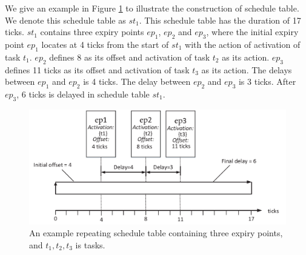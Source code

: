 \documentclass[10pt,conference]{IEEEtran}
\begin{document}
We give an example in Figure \ref{figure_st1} to illustrate the construction of schedule table. We denote this schedule table as $st_1$. This schedule table has the duration of 17 ticks. $st_1$ contains three expiry points $ep_1$, $ep_2$ and $ep_3$, where the initial expiry point $ep_1$ locates at 4 ticks from the start of $st_1$ with the action of activation of task $t_1$. $ep_2$ defines 8 as its offset and activation of task $t_2$ as its action. $ep_3$ defines 11 ticks as its offset and activation of task $t_3$ as its action. The delays between $ep_1$ and $ep_2$ is 4 ticks. The delay between $ep_2$ and $ep_3$ is 3 ticks. After $ep_3$, 6 ticks is delayed in schedule table $st_1$.
\begin{figure}[t]
  \centering
  \includegraphics[scale=.32]{graphics/figure_st1-eps-converted-to.pdf}
  \caption{An example repeating schedule table containing three expiry points, and $t_1,t_2,t_3$ is tasks.}
  \label{figure_st1}
\end{figure}



\end{document}
